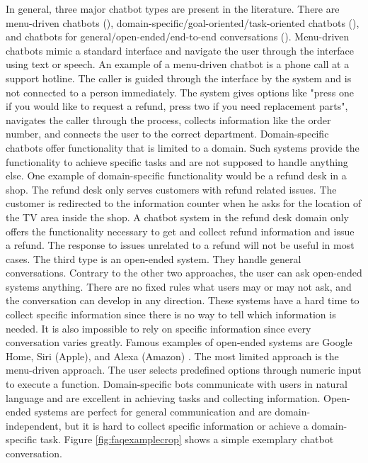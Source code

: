 In general, three major chatbot types are present in the literature.
There are menu-driven chatbots (\citet{singhbuilding}), domain-specific/goal-oriented/task-oriented chatbots (\citet{deshpande2017survey, luis2015williams, braunEvaluatingNLU, williams2017hybrid}),
and chatbots for general/open-ended/end-to-end conversations (\citet{brandtzaeg2018chatbots, singhbuilding}).
Menu-driven chatbots mimic a standard interface and navigate the user through the interface using text or speech.
An example of a menu-driven chatbot is a phone call at a support hotline.
The caller is guided through the interface by the system and is not connected to a person immediately.
The system gives options like "press one if you would like to request a refund, press two if you need replacement parts", navigates the caller through the process, collects information like the order number, and 
connects the user to the correct department.
Domain-specific chatbots offer functionality that is limited to a domain.
Such systems provide the functionality to achieve specific tasks and are not supposed to handle anything else.
One example of domain-specific functionality would be a refund desk in a shop.
The refund desk only serves customers with refund related issues.
The customer is redirected to the information counter when he asks for the location of the TV area inside the shop.
A chatbot system in the refund desk domain only offers the functionality necessary to get and collect refund information and issue a refund. 
The response to issues unrelated to a refund will not be useful in most cases.
The third type is an open-ended system.
They handle general conversations.
Contrary to the other two approaches, the user can ask open-ended systems anything. 
There are no fixed rules what users may or may not ask, and the conversation can develop in any direction.
These systems have a hard time to collect specific information since there is no way to tell which information is needed.
It is also impossible to rely on specific information since every conversation varies greatly.
Famous examples of open-ended systems are Google Home, Siri (Apple), and Alexa (Amazon) \cite{singhbuilding}.
The most limited approach is the menu-driven approach. 
The user selects predefined options through numeric input to execute a function.
Domain-specific bots communicate with users in natural language and are excellent in achieving tasks and collecting information.
Open-ended systems are perfect for general communication and are domain-independent, but it is hard to collect specific information
or achieve a domain-specific task. 
Figure \ref{fig:faqexamplecrop} shows a simple exemplary chatbot conversation.

